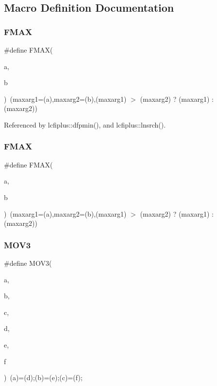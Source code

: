 \subsection{Macro Definition Documentation}
\mbox{\label{algo_8h_a985ff4ce447bced94342e89ab3766fdd}} 
\subsubsection{F\+M\+AX\hspace{0.1cm}{\footnotesize\ttfamily [1/2]}}
{\footnotesize\ttfamily \#define F\+M\+AX(\begin{DoxyParamCaption}\item[{}]{a,  }\item[{}]{b }\end{DoxyParamCaption})~(maxarg1=(a),maxarg2=(b),(maxarg1) $>$ (maxarg2) ? (maxarg1) \+: (maxarg2))}



Referenced by lcfiplus\+::dfpmin(), and lcfiplus\+::lnsrch().

\mbox{\label{algo_8h_a985ff4ce447bced94342e89ab3766fdd}} 
\subsubsection{F\+M\+AX\hspace{0.1cm}{\footnotesize\ttfamily [2/2]}}
{\footnotesize\ttfamily \#define F\+M\+AX(\begin{DoxyParamCaption}\item[{}]{a,  }\item[{}]{b }\end{DoxyParamCaption})~(maxarg1=(a),maxarg2=(b),(maxarg1) $>$ (maxarg2) ? (maxarg1) \+: (maxarg2))}

\mbox{\label{algo_8h_afa069e7bc1c4fc253e85c69fce265d2b}} 
\subsubsection{M\+O\+V3}
{\footnotesize\ttfamily \#define M\+O\+V3(\begin{DoxyParamCaption}\item[{}]{a,  }\item[{}]{b,  }\item[{}]{c,  }\item[{}]{d,  }\item[{}]{e,  }\item[{}]{f }\end{DoxyParamCaption})~(a)=(d);(b)=(e);(c)=(f);}



